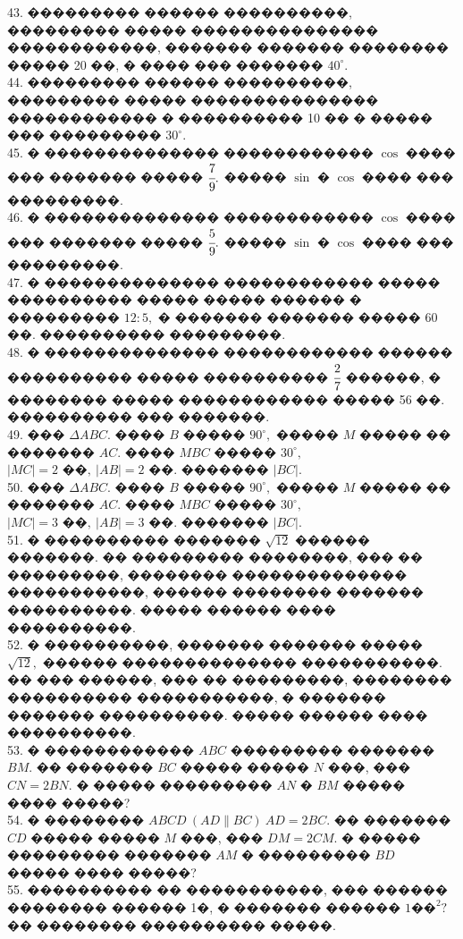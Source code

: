 \documentclass[12pt]{article}
\begin{document}
43. ��������� ������ ����������, ��������� ����� ��������������� ������������, ������� ������� �������� ����� 20 ��, � ���� ��� ������� $40^\circ.$\\
44. ��������� ������ ����������, ��������� ����� ��������������� ������������ � ���������� 10 �� � ����� ��� ��������� $30^\circ.$\\
45. � �������������� ������������ $\cos$ ���� ��� ������� ����� $\cfrac{7}{9}.$ ����� $\sin$ � $\cos$ ���� ��� ���������.\\
46. � �������������� ������������ $\cos$ ���� ��� ������� ����� $\cfrac{5}{9}.$ ����� $\sin$ � $\cos$ ���� ��� ���������.\\
47. � �������������� ������������ ����� ���������� ����� ����� ������ � ��������� $12:5,$ � ������� ������� ����� 60 ��. ���������� ���������.\\
48. � �������������� ������������ ������ ���������� ����� ���������� $\cfrac{2}{7}$ ������, � �������� ����� ������������ ����� 56 ��. ���������� ��� �������.\\
49. ��� $\Delta ABC.$ ���� $B$ ����� $90^\circ,$ ����� $M$ ����� �� ������� $AC.$ ����  $MBC$ ����� $30^\circ,$\\ $|MC|=2\text{ ��},\ |AB|=2\text{ ��}.$ ������� $|BC|.$\\
50. ��� $\Delta ABC.$ ���� $B$ ����� $90^\circ,$ ����� $M$ ����� �� ������� $AC.$ ����  $MBC$ ����� $30^\circ,$\\ $|MC|=3\text{ ��},\ |AB|=3\text{ ��}.$ ������� $|BC|.$\\
51. � ���������� ������� $\sqrt{12}$ ������ �������. �� ��������� ��������, ��� �� ���������, �������� �������������� �����������, ������ �������� ������� ����������. ����� ������ ���� ����������.\\
52. � ����������, ������� ������� ����� $\sqrt{12},$ ������ �������������� �����������. �� ��� ������, ��� �� ���������, �������� ���������� �����������, � ������� ������� ����������. ����� ������ ���� ����������.\\
53. � ������������ $ABC$ ��������� ������� $BM.$ �� ������� $BC$ ����� ����� $N$ ���, ���\\ $CN=2BN.$ � ����� ��������� $AN$ � $BM$ ����� ���� �����?\\
54. � �������� $ABCD\ (AD\parallel BC)\ AD=2BC.$ �� ������� $CD$ ����� ����� $M$ ���, ��� $DM=2CM.$ � ����� ��������� ������� $AM$ � ��������� $BD$ ����� ���� �����?\\
55. ���������� �� �����������, ��� ������ �������� ������ 1�, � ������� ������ $1\text{��}^2?$ �� �������� ���������� �����.\\
\end{document}
